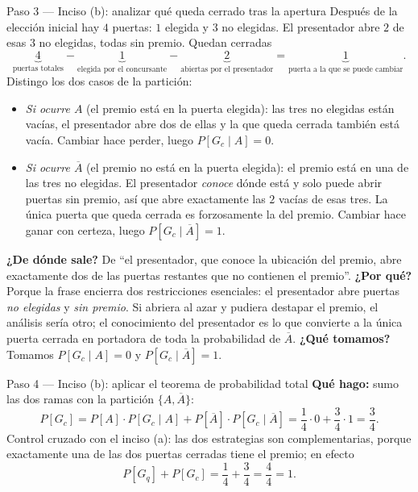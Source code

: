\documentclass[11pt]{article}
\begin{document}
\begin{sol}
\begin{paso}{Paso 3 --- Inciso (b): analizar qu\'e queda cerrado tras la apertura}
Despu\'es de la elecci\'on inicial hay $4$ puertas: $1$ elegida y $3$ no elegidas. El presentador abre $2$ de esas $3$ no elegidas, todas sin premio. Quedan cerradas
\[
\underbrace{4}_{\text{puertas totales}}
-\underbrace{1}_{\text{elegida por el concursante}}
-\underbrace{2}_{\text{abiertas por el presentador}}
=\underbrace{1}_{\text{puerta a la que se puede cambiar}} .
\]
Distingo los dos casos de la partici\'on:
\begin{itemize}[leftmargin=1.4em]
\item \emph{Si ocurre $A$} (el premio est\'a en la puerta elegida): las tres no elegidas est\'an vac\'ias, el presentador abre dos de ellas y la que queda cerrada tambi\'en est\'a vac\'ia. Cambiar hace perder, luego $P[G_{c}\mid A]=0$.
\item \emph{Si ocurre $\overline{A}$} (el premio no est\'a en la puerta elegida): el premio est\'a en una de las tres no elegidas. El presentador \emph{conoce} d\'onde est\'a y solo puede abrir puertas sin premio, as\'i que abre exactamente las $2$ vac\'ias de esas tres. La \'unica puerta que queda cerrada es forzosamente la del premio. Cambiar hace ganar con certeza, luego $P[G_{c}\mid\overline{A}]=1$.
\end{itemize}
\textbf{¿De d\'onde sale?} De ``el presentador, que conoce la ubicaci\'on del premio, abre exactamente dos de las puertas restantes que no contienen el premio''.
\textbf{¿Por qu\'e?} Porque la frase encierra dos restricciones esenciales: el presentador abre puertas \emph{no elegidas} y \emph{sin premio}. Si abriera al azar y pudiera destapar el premio, el an\'alisis ser\'ia otro; el conocimiento del presentador es lo que convierte a la \'unica puerta cerrada en portadora de toda la probabilidad de $\overline{A}$.
\textbf{¿Qu\'e tomamos?} Tomamos $P[G_{c}\mid A]=0$ y $P[G_{c}\mid\overline{A}]=1$.
\end{paso}

\begin{paso}{Paso 4 --- Inciso (b): aplicar el teorema de probabilidad total}
\textbf{Qu\'e hago:} sumo las dos ramas con la partici\'on $\{A,\overline{A}\}$:
\[
P[G_{c}]=P[A]\cdot P[G_{c}\mid A]+P[\overline{A}]\cdot P[G_{c}\mid \overline{A}]
=\frac14\cdot 0+\frac34\cdot 1=\frac34 .
\]
Control cruzado con el inciso (a): las dos estrategias son complementarias, porque exactamente una de las dos puertas cerradas tiene el premio; en efecto
\[
P[G_{q}]+P[G_{c}]=\frac14+\frac34=\frac44=1 .
\]


\end{paso}
\end{sol}
\end{document}

